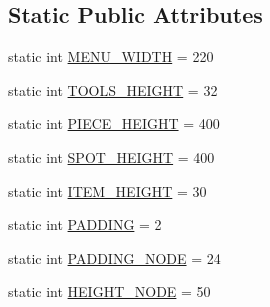 \subsection*{Static Public Attributes}
\begin{DoxyCompactItemize}
\item 
static int \hyperlink{classgearit_1_1src_1_1_g_u_i_1_1_menu_robot_editor_ad92a34daa4b78753de76bc122e72b1e3}{M\+E\+N\+U\+\_\+\+W\+I\+D\+T\+H} = 220
\item 
static int \hyperlink{classgearit_1_1src_1_1_g_u_i_1_1_menu_robot_editor_a54d5dd71266d711ac0b102fd66e37223}{T\+O\+O\+L\+S\+\_\+\+H\+E\+I\+G\+H\+T} = 32
\item 
static int \hyperlink{classgearit_1_1src_1_1_g_u_i_1_1_menu_robot_editor_a436ae2865849e12ef79e425425651185}{P\+I\+E\+C\+E\+\_\+\+H\+E\+I\+G\+H\+T} = 400
\item 
static int \hyperlink{classgearit_1_1src_1_1_g_u_i_1_1_menu_robot_editor_a0252a27d45d243d7fdef3839de3bebc7}{S\+P\+O\+T\+\_\+\+H\+E\+I\+G\+H\+T} = 400
\item 
static int \hyperlink{classgearit_1_1src_1_1_g_u_i_1_1_menu_robot_editor_acecb4d36a8863da6b9656fb6e5fcaac2}{I\+T\+E\+M\+\_\+\+H\+E\+I\+G\+H\+T} = 30
\item 
static int \hyperlink{classgearit_1_1src_1_1_g_u_i_1_1_menu_robot_editor_aa474b7202cc9c17a799275ed0b131818}{P\+A\+D\+D\+I\+N\+G} = 2
\item 
static int \hyperlink{classgearit_1_1src_1_1_g_u_i_1_1_menu_robot_editor_a5bd8bfded0c0c7d2cf0a80351f86f25b}{P\+A\+D\+D\+I\+N\+G\+\_\+\+N\+O\+D\+E} = 24
\item 
static int \hyperlink{classgearit_1_1src_1_1_g_u_i_1_1_menu_robot_editor_a8fae674b7aa130f67190dc5bc550e353}{H\+E\+I\+G\+H\+T\+\_\+\+N\+O\+D\+E} = 50
\end{DoxyCompactItemize}
